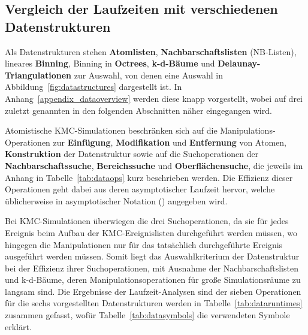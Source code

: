 \subsection{Vergleich der Laufzeiten mit verschiedenen Datenstrukturen}

Als Datenstrukturen stehen \textbf{Atomlisten}, \textbf{Nachbarschaftslisten} (NB-Listen), lineares \textbf{Binning}, Binning in \textbf{Octrees}, \textbf{k-d-Bäume} und \textbf{Delaunay-Triangulationen} zur Auswahl, von denen eine Auswahl in Abbildung~\ref{fig:datastructures} dargestellt ist.
In Anhang~\ref{appendix_dataoverview} werden diese knapp vorgestellt, wobei auf drei zuletzt genannten in den folgenden Abschnitten näher eingegangen wird.

Atomistische KMC-Simulationen beschränken sich auf die Manipulations-Operationen zur \textbf{Einfügung}, \textbf{Modifikation} und \textbf{Entfernung} von Atomen, \textbf{Konstruktion} der Datenstruktur sowie auf die Suchoperationen der \textbf{Nachbarschaftssuche}, \textbf{Bereichssuche} und \textbf{Oberflächensuche}, die jeweils im Anhang in Tabelle~\ref{tab:dataops} kurz beschrieben werden.
Die Effizienz dieser Operationen geht dabei aus deren asymptotischer Laufzeit hervor, welche üblicherweise in asymptotischer Notation (\BigO{}) angegeben wird.

Bei KMC-Simulationen überwiegen die drei Suchoperationen, da sie für jedes Ereignis beim Aufbau der KMC-Ereignislisten durchgeführt werden müssen, wo hingegen die Manipulationen nur für das tatsächlich durchgeführte Ereignis ausgeführt werden müssen.
Somit liegt das Auswahlkriterium der Datenstruktur bei der Effizienz ihrer Suchoperationen, mit Ausnahme der Nachbarschaftslisten und k-d-Bäume, deren Manipulationsoperationen für große Simulationsräume zu langsam sind.
Die Ergebnisse der Laufzeit-Analysen sind der sieben Operationen für die sechs vorgestellten Datenstrukturen werden in Tabelle~\ref{tab:dataruntimes} zusammen gefasst, wofür Tabelle~\ref{tab:datasymbols} die verwendeten Symbole erklärt.

